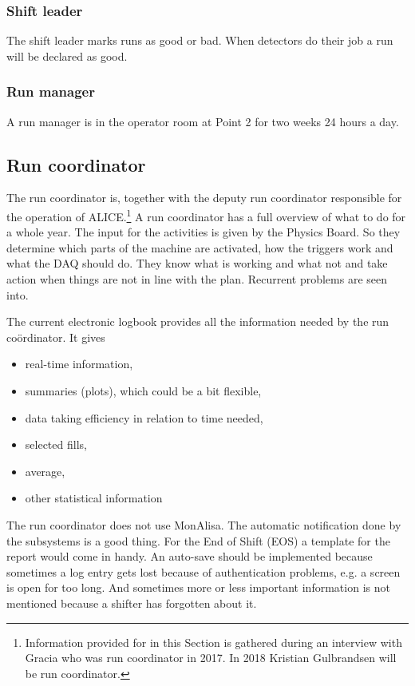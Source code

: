 \subsubsection{Shift leader}
The shift leader marks runs as good or bad. When detectors do their job a run will be declared as good. 

\subsubsection{Run manager}
A run manager is in the operator room at Point 2 for two weeks 24 hours a day.

\subsection{Run coordinator}
The run coordinator is, together with the deputy run coordinator responsible for the operation of ALICE.\footnote{Information provided for in this Section is gathered during an interview with Gracia who was run coordinator in 2017. In 2018 Kristian Gulbrandsen will be run coordinator.} A run coordinator has a full overview of what to do for a whole year. The input for the activities is given by the Physics Board. So they determine which parts of the machine are activated, how the triggers work and what the DAQ should do. They know what is working and what not and take action when things are not in line with the plan. Recurrent problems are seen into. 

The current electronic logbook provides all the information needed by the run co\"ordinator. It gives
\begin{itemize}
  \item real-time information, 
  \item summaries (plots), which could be a bit flexible,
  \item data taking efficiency in relation to time needed,
  \item selected fills,
  \item average,
  \item other statistical information
\end{itemize}
 
The run coordinator does not use MonAlisa. The automatic notification done by the subsystems is a good thing. For the End of Shift (EOS) a template for the report would come in handy. An auto-save should be implemented because sometimes a log entry gets lost because of authentication problems, e.g. a screen is open for too long. And sometimes more or less important information is not mentioned because a shifter has forgotten about it.

